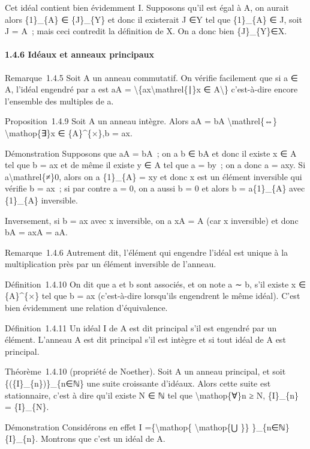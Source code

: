 \documentclass[]{article}
\begin{document}
Cet idéal contient bien évidemment I. Supposons qu'il est égal à A, on
aurait alors \{1\}\_\{A\} ∈ \{J\}\_\{Y\} et donc il existerait J ∈Y tel
que \{1\}\_\{A\} ∈ J, soit J = A~; mais ceci contredit la définition de
X. On a donc bien \{J\}\_\{Y\}∈X.

\paragraph{1.4.6 Idéaux et anneaux principaux}

Remarque~1.4.5 Soit A un anneau commutatif. On vérifie facilement que si
a ∈ A, l'idéal engendré par a est aA =
\textbackslash{}\{ax\textbackslash{}mathrel\{∣\}x ∈ A\textbackslash{}\}
c'est-à-dire encore l'ensemble des multiples de a.

Proposition~1.4.9 Soit A un anneau intègre. Alors aA = bA
\textbackslash{}mathrel\{⇔\} \textbackslash{}mathop\{∃\}x ∈
\{A\}\^{}\{×\},b = ax.

Démonstration Supposons que aA = bA~; on a b ∈ bA et donc il existe x ∈
A tel que b = ax et de même il existe y ∈ A tel que a = by~; on a donc a
= axy. Si a\textbackslash{}mathrel\{≠\}0, alors on a \{1\}\_\{A\} = xy
et donc x est un élément inversible qui vérifie b = ax~; si par contre a
= 0, on a aussi b = 0 et alors b = a\{1\}\_\{A\} avec \{1\}\_\{A\}
inversible.

Inversement, si b = ax avec x inversible, on a xA = A (car x inversible)
et donc bA = axA = aA.

Remarque~1.4.6 Autrement dit, l'élément qui engendre l'idéal est unique
à la multiplication près par un élément inversible de l'anneau.

Définition~1.4.10 On dit que a et b sont associés, et on note a ∼ b,
s'il existe x ∈ \{A\}\^{}\{×\} tel que b = ax (c'est-à-dire lorsqu'ils
engendrent le même idéal). C'est bien évidemment une relation
d'équivalence.

Définition~1.4.11 Un idéal I de A est dit principal s'il est engendré
par un élément. L'anneau A est dit principal s'il est intègre et si tout
idéal de A est principal.

Théorème~1.4.10 (propriété de Noether). Soit A un anneau principal, et
soit \{(\{I\}\_\{n\})\}\_\{n∈ℕ\} une suite croissante d'idéaux. Alors
cette suite est stationnaire, c'est à dire qu'il existe N ∈ ℕ tel que
\textbackslash{}mathop\{∀\}n ≥ N, \{I\}\_\{n\} = \{I\}\_\{N\}.

Démonstration Considérons en effet I =\{\textbackslash{}mathop\{
\textbackslash{}mathop\{⋃ \}\} \}\_\{n∈ℕ\}\{I\}\_\{n\}. Montrons que
c'est un idéal de A.
\end{document}
